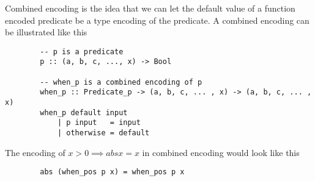         Combined encoding is the idea that we can let the
        default value of a function encoded predicate be a type
        encoding of the predicate. A combined encoding can be illustrated
        like this
        \begin{verbatim}
        -- p is a predicate
        p :: (a, b, c, ..., x) -> Bool  

        -- when_p is a combined encoding of p
        when_p :: Predicate_p -> (a, b, c, ... , x) -> (a, b, c, ... , x)
        when_p default input
            | p input   = input
            | otherwise = default
        \end{verbatim}
        The encoding of $x > 0 \implies abs x = x$ in combined encoding would look like
        this
        \begin{verbatim}
        abs (when_pos p x) = when_pos p x
        \end{verbatim}
